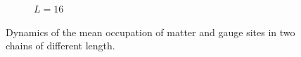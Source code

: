 \documentclass[a4paper]{article}
\begin{document}
\begin{figure}[!ht]
\begin{subfigure}[l]{0.58\textwidth}
        \caption{$L = 16$}
    \end{subfigure}
    \caption{Dynamics of the mean occupation of matter and gauge sites in two chains of different length.}
\end{figure}

\printbibliography
\end{document}
